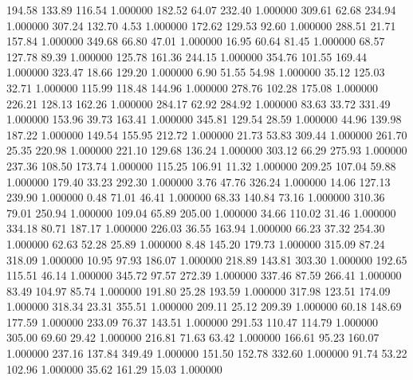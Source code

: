    194.58    133.89    116.54  1.000000
    182.52     64.07    232.40  1.000000
    309.61     62.68    234.94  1.000000
    307.24    132.70      4.53  1.000000
    172.62    129.53     92.60  1.000000
    288.51     21.71    157.84  1.000000
    349.68     66.80     47.01  1.000000
     16.95     60.64     81.45  1.000000
     68.57    127.78     89.39  1.000000
    125.78    161.36    244.15  1.000000
    354.76    101.55    169.44  1.000000
    323.47     18.66    129.20  1.000000
      6.90     51.55     54.98  1.000000
     35.12    125.03     32.71  1.000000
    115.99    118.48    144.96  1.000000
    278.76    102.28    175.08  1.000000
    226.21    128.13    162.26  1.000000
    284.17     62.92    284.92  1.000000
     83.63     33.72    331.49  1.000000
    153.96     39.73    163.41  1.000000
    345.81    129.54     28.59  1.000000
     44.96    139.98    187.22  1.000000
    149.54    155.95    212.72  1.000000
     21.73     53.83    309.44  1.000000
    261.70     25.35    220.98  1.000000
    221.10    129.68    136.24  1.000000
    303.12     66.29    275.93  1.000000
    237.36    108.50    173.74  1.000000
    115.25    106.91     11.32  1.000000
    209.25    107.04     59.88  1.000000
    179.40     33.23    292.30  1.000000
      3.76     47.76    326.24  1.000000
     14.06    127.13    239.90  1.000000
      0.48     71.01     46.41  1.000000
     68.33    140.84     73.16  1.000000
    310.36     79.01    250.94  1.000000
    109.04     65.89    205.00  1.000000
     34.66    110.02     31.46  1.000000
    334.18     80.71    187.17  1.000000
    226.03     36.55    163.94  1.000000
     66.23     37.32    254.30  1.000000
     62.63     52.28     25.89  1.000000
      8.48    145.20    179.73  1.000000
    315.09     87.24    318.09  1.000000
     10.95     97.93    186.07  1.000000
    218.89    143.81    303.30  1.000000
    192.65    115.51     46.14  1.000000
    345.72     97.57    272.39  1.000000
    337.46     87.59    266.41  1.000000
     83.49    104.97     85.74  1.000000
    191.80     25.28    193.59  1.000000
    317.98    123.51    174.09  1.000000
    318.34     23.31    355.51  1.000000
    209.11     25.12    209.39  1.000000
     60.18    148.69    177.59  1.000000
    233.09     76.37    143.51  1.000000
    291.53    110.47    114.79  1.000000
    305.00     69.60     29.42  1.000000
    216.81     71.63     63.42  1.000000
    166.61     95.23    160.07  1.000000
    237.16    137.84    349.49  1.000000
    151.50    152.78    332.60  1.000000
     91.74     53.22    102.96  1.000000
     35.62    161.29     15.03  1.000000
